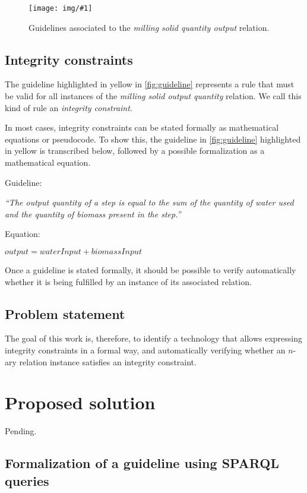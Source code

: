\documentclass[a4paper, 10pt]{article}
\newcommand{\nary}{$n$-ary\xspace}
\newcommand{\img}[3]{
  \begin{figure}[H]
    \centering
    \texttt{[image: img/\#1]}
    \caption{#2}
    \label{#3}
  \end{figure}
}
\begin{document}
\img{guideline.jpg}
    {
      Guidelines associated to the \textit{milling solid quantity output}
      relation.
    }
    {fig:guideline}


\subsection{Integrity constraints}

The guideline highlighted in yellow in \autoref{fig:guideline} represents
a rule that must be valid for all instances of the \textit{milling solid output quantity} relation. We call this kind of rule an \textit{integrity constraint}.

In most cases, integrity constraints can be stated formally as mathematical
equations or pseudocode. To show this, the guideline in \autoref{fig:guideline}
highlighted in yellow is transcribed below, followed by a possible
formalization as a mathematical equation.

Guideline:

\begin{center}
  \textit{``The output quantity of a step is equal to the sum of the quantity
  of water used and the quantity of biomass present in the step.''}
\end{center}

Equation:

\begin{center}
  $output = waterInput + biomassInput$
\end{center}

Once a guideline is stated formally, it should be possible to verify
automatically whether it is being fulfilled by an instance of its associated
relation.


\subsection{Problem statement}

The goal of this work is, therefore, to identify a technology that allows expressing integrity constraints in a formal way, and automatically verifying whether an \nary relation instance satisfies an integrity constraint.


\section{Proposed solution}

Pending.


\subsection{Formalization of a guideline using SPARQL queries}
\end{document}
